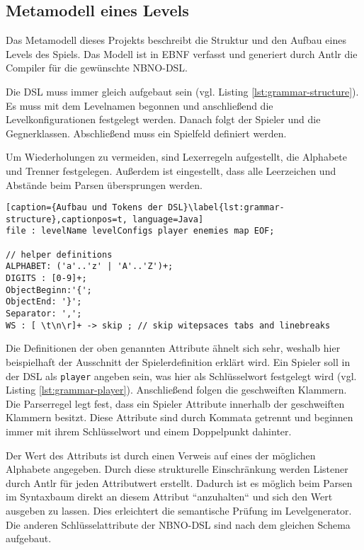 \subsection{Metamodell eines Levels}
Das Metamodell dieses Projekts beschreibt die Struktur und den Aufbau eines Levels des Spiels. Das Modell ist in EBNF verfasst und generiert durch Antlr die Compiler für die gewünschte NBNO-DSL.

Die DSL muss immer gleich aufgebaut sein (vgl. Listing \ref{lst:grammar-structure}). Es muss mit dem Levelnamen begonnen und anschließend die Levelkonfigurationen festgelegt werden. Danach folgt der Spieler und die Gegnerklassen. Abschließend muss ein Spielfeld definiert werden.

Um Wiederholungen zu vermeiden, sind Lexerregeln aufgestellt, die Alphabete und Trenner festgelegen.
Außerdem ist eingestellt, dass alle Leerzeichen und Abstände beim Parsen übersprungen werden.

\begin{lstlisting}[caption={Aufbau und Tokens der DSL}\label{lst:grammar-structure},captionpos=t, language=Java] 
file : levelName levelConfigs player enemies map EOF;

// helper definitions
ALPHABET: ('a'..'z' | 'A'..'Z')+;
DIGITS : [0-9]+;
ObjectBeginn:'{';
ObjectEnd: '}';
Separator: ',';
WS : [ \t\n\r]+ -> skip ; // skip witepsaces tabs and linebreaks
\end{lstlisting}
 
Die Definitionen der oben genannten Attribute ähnelt sich sehr, weshalb hier beispielhaft der Ausschnitt der Spielerdefinition erklärt wird. Ein Spieler soll in der DSL als \texttt{player} angeben sein, was hier als Schlüsselwort festgelegt wird (vgl. Listing \ref{lst:grammar-player}). Anschließend folgen die geschweiften Klammern. Die Parserregel legt fest, dass ein Spieler Attribute innerhalb der geschweiften Klammern besitzt. Diese Attribute sind durch Kommata getrennt und beginnen immer mit ihrem Schlüsselwort und einem Doppelpunkt dahinter. 

Der Wert des Attributs ist durch einen Verweis auf eines der möglichen Alphabete angegeben. Durch diese strukturelle Einschränkung werden Listener durch Antlr für jeden Attributwert erstellt. Dadurch ist es möglich beim Parsen im Syntaxbaum direkt an diesem Attribut ``anzuhalten`` und sich den Wert ausgeben zu lassen. Dies erleichtert die semantische Prüfung im Levelgenerator. Die anderen Schlüsselattribute der NBNO-DSL sind nach dem gleichen Schema aufgebaut. 


